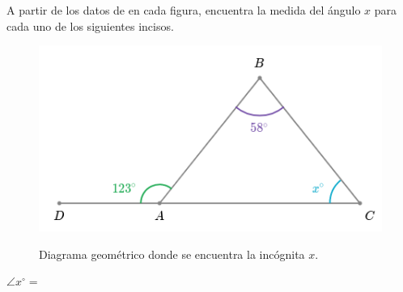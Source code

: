 \question[10] A partir de los datos de en cada figura, encuentra la medida del \'angulo $x$ para cada uno de los siguientes incisos.
   
    \begin{minipage}[b]{0.43\textwidth}
        \begin{figure}[H]
            \caption{Diagrama geométrico donde se encuentra la inc\'ognita $x$.}
            \includegraphics[width=\linewidth]{Images/triangle_angle_01}
            \label{fig:triangle_angle_01}
        \end{figure}
        {
        \color{cielo}\textbf{$\angle x^\circ =$}} \fbox{
        \begin{minipage}{2cm}
            \hfill\vspace{0.5cm}
        \end{minipage}
    }
    \end{minipage}
    \hspace{2cm}
